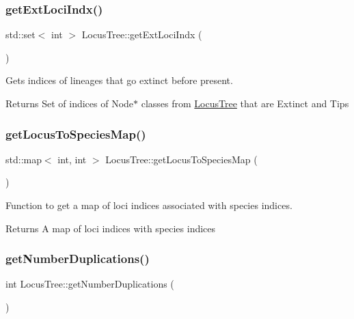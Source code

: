\subsubsection{\texorpdfstring{getExtLociIndx()}{getExtLociIndx()}}
{\footnotesize\ttfamily std\+::set$<$ int $>$ Locus\+Tree\+::get\+Ext\+Loci\+Indx (\begin{DoxyParamCaption}{ }\end{DoxyParamCaption})}



Gets indices of lineages that go extinct before present. 

\begin{DoxyReturn}{Returns}
Set of indices of Node$\ast$ classes from \mbox{\hyperlink{class_locus_tree}{Locus\+Tree}} that are Extinct and Tips 
\end{DoxyReturn}
\mbox{\label{class_locus_tree_a33f60a30325b66eb6953e909517980a4}} 
\subsubsection{\texorpdfstring{getLocusToSpeciesMap()}{getLocusToSpeciesMap()}}
{\footnotesize\ttfamily std\+::map$<$ int, int $>$ Locus\+Tree\+::get\+Locus\+To\+Species\+Map (\begin{DoxyParamCaption}{ }\end{DoxyParamCaption})}



Function to get a map of loci indices associated with species indices. 

\begin{DoxyReturn}{Returns}
A map of loci indices with species indices 
\end{DoxyReturn}
\mbox{\label{class_locus_tree_a5ab14226be51de0219ac2eee98b18dec}} 
\subsubsection{\texorpdfstring{getNumberDuplications()}{getNumberDuplications()}}
{\footnotesize\ttfamily int Locus\+Tree\+::get\+Number\+Duplications (\begin{DoxyParamCaption}{ }\end{DoxyParamCaption})}



